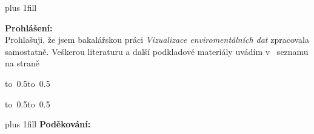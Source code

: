 \documentclass[12pt,a4paper]{report}
\begin{document}
\vglue 0pt plus 1fill

\noindent
{\bfseries Prohlášení:} \\
Prohlašuji, že jsem bakalářskou práci \emph{Vizualizace enviromentálních dat} zpracovala samostatně. Veškerou literaturu a další podkladové materiály uvádím v~ seznamu na straně %

\vspace{10mm}

\hbox{\hbox to 0.5\hbox to 0.5}

\vspace{1mm}
\hbox{\hbox to 0.5\hsize{%

\hss}\hbox to 0.5}

\vspace{20mm}

\newpage

\vglue 0pt plus 1fill
\noindent
{\bfseries Poděkování:} \\

\newpage
\end{document}
